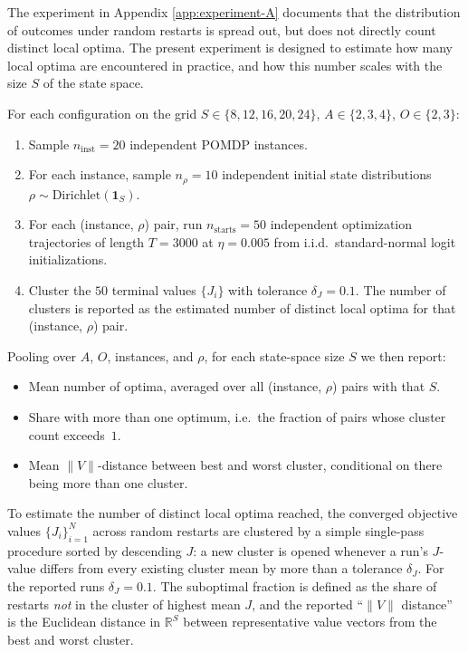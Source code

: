 \documentclass{article}
\theoremstyle{definition}
\theoremstyle{remark}
\begin{document}
The experiment in Appendix \ref{app:experiment-A} documents that the distribution of outcomes under random restarts is spread out, but does not directly count distinct local optima. 
The present experiment is designed to estimate how many local optima are encountered in practice, and how this number scales with the size $S$ of the state space.

For each configuration on the grid $S \in \{8, 12, 16, 20, 24\}$, $A \in \{2, 3, 4\}$, $O \in \{2, 3\}$:
 
\begin{enumerate}
  \item Sample $n_{\text{inst}} = 20$ independent POMDP instances.
  
  \item For each instance, sample $n_\rho = 10$ independent initial state distributions $\rho \sim \mathrm{Dirichlet}(\mathbf{1}_S)$.
  
  \item For each (instance, $\rho$) pair, run $n_{\text{starts}} = 50$ independent optimization trajectories of length $T = 3000$ at $\eta = 0.005$ from i.i.d.\ standard-normal logit initializations.
  
  \item Cluster the $50$ terminal values $\{J_i\}$ with tolerance $\delta_J = 0.1$. The number of clusters is reported as the estimated number of distinct local optima for that (instance, $\rho$) pair.
\end{enumerate}
 
Pooling over $A$, $O$, instances, and $\rho$, for each state-space size $S$
we then report:
\begin{itemize}
  \item Mean number of optima, averaged over all (instance, $\rho$) pairs with that $S$.
  
  \item Share with more than one optimum, i.e.\ the fraction of pairs whose cluster count exceeds~$1$.
  
  \item Mean $\|V\|$-distance between best and worst cluster, conditional on there being more than one cluster.
\end{itemize}

To estimate the number of distinct local optima reached, the converged objective values $\{J_i\}_{i=1}^{N}$ across random restarts are clustered by a simple single-pass procedure sorted by descending $J$: a new cluster is opened whenever a run's $J$-value differs from every existing cluster mean by more than a tolerance $\delta_J$. For the reported runs $\delta_J = 0.1$. The suboptimal fraction is defined as the share of restarts \emph{not} in the cluster of highest mean $J$, and the reported ``$\|V\|$ distance'' is the Euclidean distance in $\mathbb{R}^S$ between representative value vectors from the best and worst cluster.
 
\end{document}
